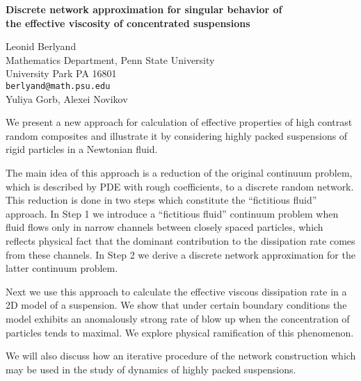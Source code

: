 \documentclass{report}
\begin{document}

\begin{center}
{\large
{\bf Discrete network approximation for singular behavior of \\
the effective viscosity of concentrated suspensions}}

	Leonid Berlyand \\
	Mathematics Department, Penn State University \\
	University Park  PA 16801  \\
	{\tt berlyand@math.psu.edu} \\
	Yuliya Gorb, Alexei Novikov
\end{center}
We present a new approach for calculation of effective
properties of high contrast random composites and illustrate
it by considering highly packed suspensions of rigid
particles in a Newtonian fluid.

The main idea of this
approach is a reduction of the original continuum problem,
which is described by PDE with rough coefficients, to a
discrete random network. This reduction is done in two steps
which constitute the ``fictitious fluid'' approach. In Step 1
we introduce a ``fictitious fluid'' continuum problem when
fluid flows only in narrow channels between closely spaced
particles, which reflects physical fact that the dominant
contribution to the dissipation rate comes from these
channels. In Step 2 we derive a discrete network
approximation for the latter continuum problem.

Next we
use this approach to calculate the effective viscous
dissipation rate in a 2D model of a suspension. We show that
under certain boundary conditions the model exhibits an
anomalously strong rate of blow up when the concentration of
particles tends to maximal. We explore physical ramification
of this phenomenon.

We will also discuss how an
iterative procedure of the network construction which may be
used in the study of dynamics of highly packed suspensions.



\end{document}
